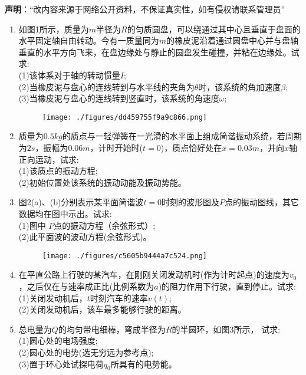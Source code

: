 
\textbf{声明}：“改内容来源于网络公开资料，不保证真实性，如有侵权请联系管理员”
\begin{enumerate}
\item 如图1所示，质量为$m$半径为$R$的匀质圆盘，可以绕通过其中心且垂直于盘面的水平固定轴自由转动。今有一质量同为$m$的橡皮泥沿着通过圆盘中心并与盘轴垂直的水平方向飞来，在盘边缘处与静止的圆盘发生碰撞，并粘在边缘处。试求:\\
(1)该体系对于轴的转动惯量$I$;\\
(2)当橡皮泥与盘心的连线转到与水平线的夹角为$\theta$时，该系统的角加速度$\beta$;\\
(3)当橡皮泥与盘心的连线转到竖直时，该系统的角速度$\omega$;
\begin{figure}[ht]
\centering
\texttt{[image: ./figures/dd459755f9a9c866.png]}
\caption{} \label{fig_SD15_3}
\end{figure}
\item 质量为$0.5kg$的质点与一轻弹簧在一光滑的水平面上组成简谐振动系统，若周期为$2s$，振幅为$0.06m$，计时开始时($t=0$)，质点恰好处在$x=0.03m$，并向$x$轴正向运动，试求:\\
(1)该质点的振动方程;\\
(2)初始位置处该系统的振动动能及振动势能。
\item 图2(a)、(b)分别表示某平面简谐波$t=0$时刻的波形图及$ P$点的振动图线，其它数据均在图中示出。试求:\\
(1)图中 $P$点的振动方程（余弦形式）;\\
(2)此平面波的波动方程(余弦形式)。
\begin{figure}[ht]
\centering
\texttt{[image: ./figures/c5605b9444a7c524.png]}
\caption{} \label{fig_SD15_2}
\end{figure}
\item 在平直公路上行驶的某汽车，在刚刚关闭发动机时(作为计时起点)的速度为$ v_0$，之后仅在与速率成正比(比例系数为$a$)的阻力作用下行驶，直到停止。试求:\\
(1)关闭发动机后，$t$时刻汽车的速率$v(t)$;\\
(2)关闭发动机后，该车最多能够行驶的距离。
\item 总电量为$Q$的均匀带电细棒，弯成半径为$R$的半圆环，如图3所示，
试求:\\
(1)圆心处的电场强度;\\
(2)圆心处的电势(选无穷远为参考点);\\
(3)置于环心处试探电荷$q_0$所具有的电势能。

\end{enumerate}
